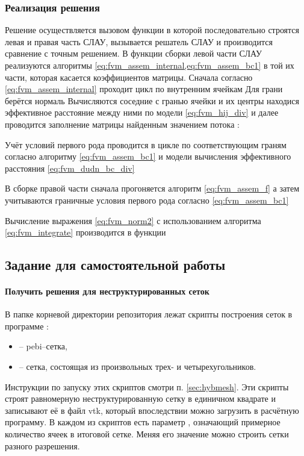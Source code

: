\subsubsection{Реализация решения}
Решение осуществляется вызовом функции
в которой последовательно строятся левая и правая часть СЛАУ,
вызывается решатель СЛАУ и производится сравнение
с точным решением.
В функции сборки левой части СЛАУ
реализуются алгоритмы \cref{eq:fvm_assem_internal,eq:fvm_assem_bc1}
в той их части, которая касается коэффициентов матрицы.
Сначала согласно \cref{eq:fvm_assem_internal}
проходит цикл по внутренним ячейкам
Для грани берётся нормаль
Вычисляются соседние с гранью ячейки и их центры
находися эффективное расстояние между ними по модели
\cref{eq:fvm_hij_div}
и далее проводится заполнение матрицы найденным значением потока :

Учёт условий первого рода проводится в
цикле по соответствующим граням согласно алгоритму \cref{eq:fvm_assem_bc1}
и модели вычисления эффективного расстояния \cref{eq:fvm_dudn_bc_div}
 
В сборке правой части
сначала прогоняется алгоритм \cref{eq:fvm_assem_f}
а затем учитываются граничные условия первого рода согласно \cref{eq:fvm_assem_bc1}

Вычисление выражения
\cref{eq:fvm_norm2} с использованием
алгоритма \cref{eq:fvm_integrate}
производится в функции

\subsection{Задание для самостоятельной работы}
\paragraph{Получить решения для неструктурированных сеток}
В папке  корневой директории репозитория
лежат скрипты построения сеток в программе :
\begin{itemize}
\item {} -- pebi--сетка,
\item {} -- сетка, состоящая из произвольных трех- и четырехугольников.
\end{itemize}
Инструкции по запуску этих скриптов смотри п. \ref{sec:hybmesh}.
Эти скрипты строят равномерную неструктурированную сетку
в единичном квадрате
и записывают её в файл vtk, который впоследствии можно загрузить
в расчётную программу.
В каждом из скриптов есть параметр , означающий
примерное количество ячеек в итоговой сетке.
Меняя его значение можно строить сетки разного разрешения.

